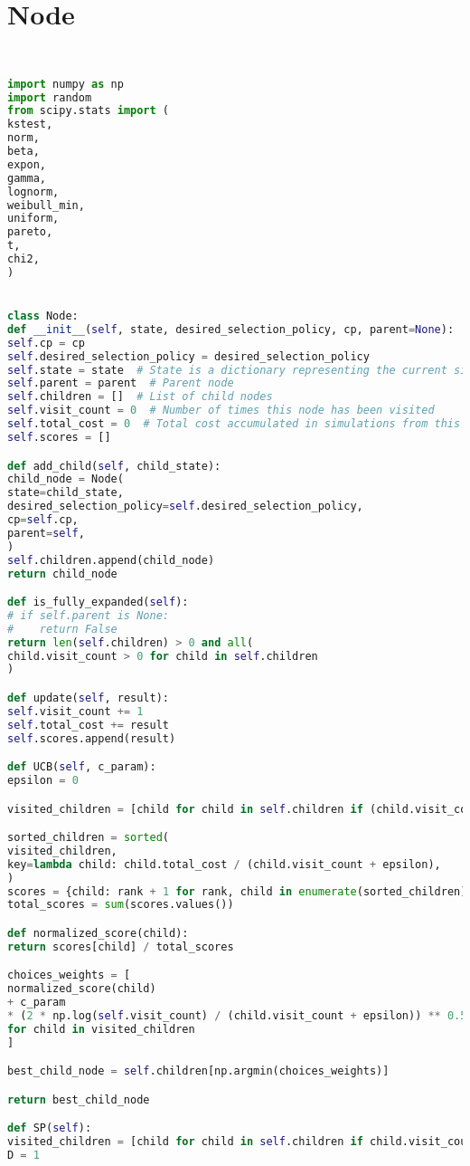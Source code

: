\section{Node}
\begin{lstlisting}[language = Python]
    

import numpy as np
import random
from scipy.stats import (
kstest,
norm,
beta,
expon,
gamma,
lognorm,
weibull_min,
uniform,
pareto,
t,
chi2,
)


class Node:
def __init__(self, state, desired_selection_policy, cp, parent=None):
self.cp = cp
self.desired_selection_policy = desired_selection_policy
self.state = state  # State is a dictionary representing the current situation
self.parent = parent  # Parent node
self.children = []  # List of child nodes
self.visit_count = 0  # Number of times this node has been visited
self.total_cost = 0  # Total cost accumulated in simulations from this node
self.scores = []

def add_child(self, child_state):
child_node = Node(
state=child_state,
desired_selection_policy=self.desired_selection_policy,
cp=self.cp,
parent=self,
)
self.children.append(child_node)
return child_node

def is_fully_expanded(self):
# if self.parent is None:
#    return False
return len(self.children) > 0 and all(
child.visit_count > 0 for child in self.children
)

def update(self, result):
self.visit_count += 1
self.total_cost += result
self.scores.append(result)

def UCB(self, c_param):
epsilon = 0

visited_children = [child for child in self.children if (child.visit_count > 0)]

sorted_children = sorted(
visited_children,
key=lambda child: child.total_cost / (child.visit_count + epsilon),
)
scores = {child: rank + 1 for rank, child in enumerate(sorted_children)}
total_scores = sum(scores.values())

def normalized_score(child):
return scores[child] / total_scores

choices_weights = [
normalized_score(child)
+ c_param
* (2 * np.log(self.visit_count) / (child.visit_count + epsilon)) ** 0.5
for child in visited_children
]

best_child_node = self.children[np.argmin(choices_weights)]

return best_child_node

def SP(self):
visited_children = [child for child in self.children if child.visit_count > 0]
D = 1


\end{lstlisting}
